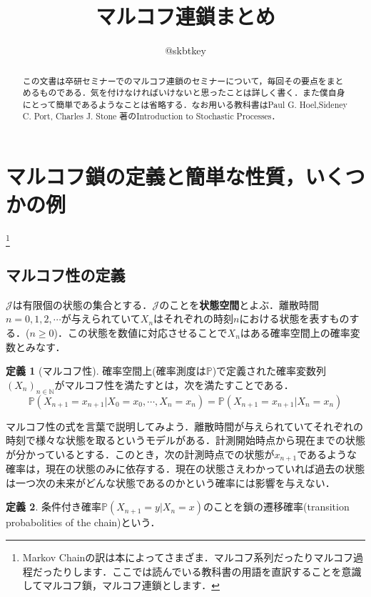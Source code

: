 \documentclass[12pt, a4paper]{jsarticle}
\title{マルコフ連鎖まとめ}
\author{@skbtkey}
\date{}
\theoremstyle{definition}
\newtheorem{defn}{定義}[section]
\newcommand{\NN}{{\mathbb{N}}} %
\begin{document}
\maketitle
\begin{abstract}
この文書は卒研セミナーでのマルコフ連鎖のセミナーについて，毎回その要点をまとめるものである．気を付けなければいけないと思ったことは詳しく書く．また僕自身にとって簡単であるようなことは省略する．なお用いる教科書はPaul G. Hoel,Sideney C. Port, Charles J. Stone 著のIntroduction to Stochastic Processes．
\end{abstract}

\section{マルコフ鎖の定義と簡単な性質，いくつかの例}\footnote{Markov Chainの訳は本によってさまざま．マルコフ系列だったりマルコフ過程だったりします．ここでは読んでいる教科書の用語を直訳することを意識してマルコフ鎖，マルコフ連鎖とします．}

\subsection{マルコフ性の定義}
$\mathcal{J}$は有限個の状態の集合とする．$\mathcal{J}$のことを{\bf 状態空間}とよぶ．離散時間$n = 0,1,2,\cdots$が与えられていて$X_n$はそれぞれの時刻$n$における状態を表すものする．($n \ge 0$)．この状態を数値に対応させることで$X_n$はある確率空間上の確率変数とみなす．
\begin{screen}
	\begin{defn}[マルコフ性]
		確率空間上(確率測度は$\mathbb{P}$)で定義された確率変数列$(X_n)_{n \in \NN}$がマルコフ性を満たすとは，次を満たすことである．
		\[\mathbb{P}(X_{n+1} = x_{n+1} | X_0 = x_0 , \cdots , X_n = x_n) = \mathbb{P}(X_{n+1} = x_{n+1} | X_n = x_n)\]
	\end{defn}
\end{screen}

マルコフ性の式を言葉で説明してみよう．離散時間が与えられていてそれぞれの時刻で様々な状態を取るというモデルがある．計測開始時点から現在までの状態が分かっているとする．このとき，次の計測時点での状態が$x_{n+1}$であるような確率は，現在の状態のみに依存する．現在の状態さえわかっていれば過去の状態は一つ次の未来がどんな状態であるのかという確率には影響を与えない．

\begin{screen}
	\begin{defn}
		条件付き確率$\mathbb{P}(X_{n+1} = y | X_n = x)$のことを鎖の遷移確率(transition probabolities of the chain)という．
	\end{defn}
\end{screen}
\end{document}
